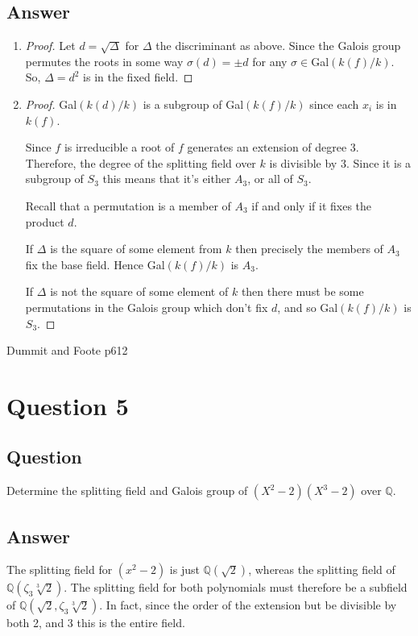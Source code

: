 \documentclass[11pt]{article}
\begin{document}
\subsection{Answer}
\begin{enumerate}
\item \begin{proof} Let $d = \sqrt\Delta$ for $\Delta$ the discriminant as above. Since the Galois group permutes the roots in some way $\sigma(d) =\pm d$ for any $\sigma \in $Gal$(k(f)/k)$. So, $\Delta=d^2$ is in the fixed field.\end{proof}
\item \begin{proof}
Gal$(k(d)/k)$ is a subgroup of Gal$(k(f)/k)$ since each $x_i$ is in $k(f)$.

Since $f$ is irreducible a root of $f$ generates an extension of degree $3$. Therefore, the degree of the splitting field over $k$ is divisible by $3$. Since it is a subgroup of $S_3$ this means that it's either $A_3$, or all of $S_3$.

Recall that a permutation is a member of $A_3$ if and only if it fixes the product $d$.

If $\Delta$ is the square of some element from $k$ then precisely the members of $A_3$ fix the base field.  Hence Gal$(k(f)/k)$ is $A_3$.

If $\Delta$ is not the square of some element of $k$ then there must be some permutations  in the Galois group which don't fix $d$, and so  Gal$(k(f)/k)$ is $S_3$.
\end{proof}
\end{enumerate}
Dummit and Foote p612

\section{Question 5}
\subsection{Question}
Determine the splitting field and Galois group of $(X^2-2)(X^3-2)$ over $\mathbb{Q}$.
\subsection{Answer}
The splitting field for $(x^2-2)$ is just $\mathbb{Q}(\sqrt2)$, whereas the splitting field of $\mathbb{Q}(\zeta_3\sqrt[3]2)$. The splitting field for both polynomials must therefore be a subfield of $\mathbb{Q}(\sqrt2, \zeta_3 \sqrt[3]2)$. In fact, since the order of the extension but be divisible by both 2, and 3 this is the entire field.
\end{document}
